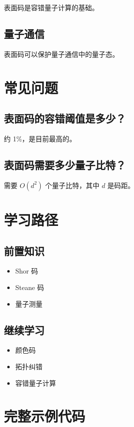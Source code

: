 \documentclass[12pt,a4paper]{article}
\begin{document}
表面码是容错量子计算的基础。

\subsection{量子通信}

表面码可以保护量子通信中的量子态。

\section{常见问题}

\subsection{表面码的容错阈值是多少？}

约 1\%，是目前最高的。

\subsection{表面码需要多少量子比特？}

需要 $O(d^2)$ 个量子比特，其中 $d$ 是码距。

\section{学习路径}

\subsection{前置知识}
\begin{itemize}
  \item Shor 码
  \item Steane 码
  \item 量子测量
\end{itemize}

\subsection{继续学习}
\begin{itemize}
  \item 颜色码
  \item 拓扑纠错
  \item 容错量子计算
\end{itemize}

\section{完整示例代码}
\end{document}
